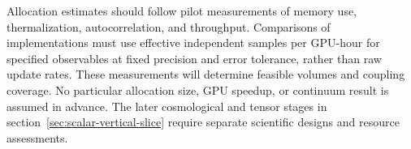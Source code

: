 Allocation estimates should follow pilot measurements of memory use, thermalization, autocorrelation, and throughput.  Comparisons of implementations must use effective independent samples per GPU-hour for specified observables at fixed precision and error tolerance, rather than raw update rates.  These measurements will determine feasible volumes and coupling coverage.  No particular allocation size, GPU speedup, or continuum result is assumed in advance.  The later cosmological and tensor stages in section~\ref{sec:scalar-vertical-slice} require separate scientific designs and resource assessments.
